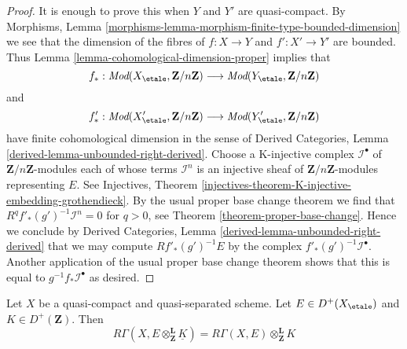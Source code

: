 \begin{proof}
It is enough to prove this when $Y$ and $Y'$ are quasi-compact.
By Morphisms, Lemma
\ref{morphisms-lemma-morphism-finite-type-bounded-dimension}
we see that the dimension of the fibres of
$f : X \to Y$ and $f' : X' \to Y'$ are bounded. Thus
Lemma \ref{lemma-cohomological-dimension-proper} implies that
$$
f_* :
\textit{Mod}(X_\etale, \mathbf{Z}/n\mathbf{Z})
\longrightarrow
\textit{Mod}(Y_\etale, \mathbf{Z}/n\mathbf{Z})
$$
and
$$
f'_* :
\textit{Mod}(X'_\etale, \mathbf{Z}/n\mathbf{Z})
\longrightarrow
\textit{Mod}(Y'_\etale, \mathbf{Z}/n\mathbf{Z})
$$
have finite cohomological dimension in the sense of
Derived Categories, Lemma \ref{derived-lemma-unbounded-right-derived}.
Choose a K-injective complex $\mathcal{I}^\bullet$
of $\mathbf{Z}/n\mathbf{Z}$-modules each of whose
terms $\mathcal{I}^n$ is an injective sheaf of
$\mathbf{Z}/n\mathbf{Z}$-modules representing $E$.
See Injectives, Theorem
\ref{injectives-theorem-K-injective-embedding-grothendieck}.
By the usual proper base change theorem we find
that $R^qf'_*(g')^{-1}\mathcal{I}^n = 0$ for $q > 0$, see
Theorem \ref{theorem-proper-base-change}.
Hence we conclude by 
Derived Categories, Lemma \ref{derived-lemma-unbounded-right-derived}
that we may compute $Rf'_*(g')^{-1}E$ by the complex
$f'_*(g')^{-1}\mathcal{I}^\bullet$. Another application
of the usual proper base change theorem shows that
this is equal to $g^{-1}f_*\mathcal{I}^\bullet$ as desired.
\end{proof}

\begin{lemma}
\label{lemma-pull-out-constant}
Let $X$ be a quasi-compact and quasi-separated scheme.
Let $E \in D^+(X_\etale)$ and $K \in D^+(\mathbf{Z})$.
Then
$$
R\Gamma(X, E \otimes_\mathbf{Z}^\mathbf{L} \underline{K}) =
R\Gamma(X, E) \otimes_\mathbf{Z}^\mathbf{L} K
$$
\end{lemma}

